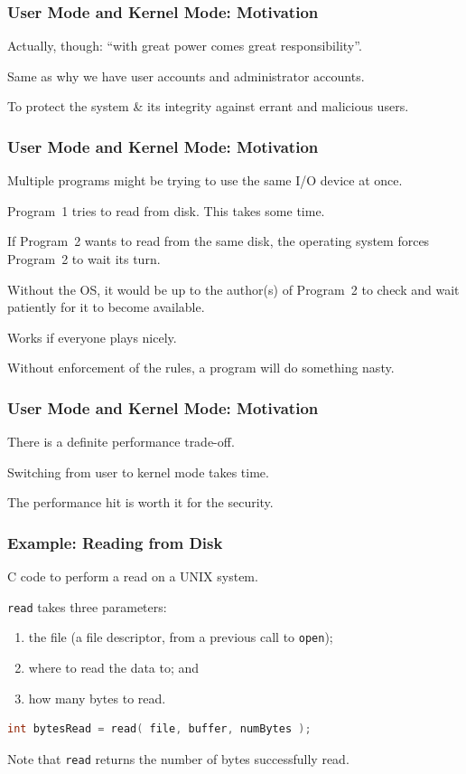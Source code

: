 \begin{frame}
\frametitle{User Mode and Kernel Mode: Motivation}


Actually, though: ``with great power comes great responsibility''.


Same as why we have user accounts and administrator accounts. 

To protect the system \& its integrity against errant and malicious users.


\end{frame}

\begin{frame}
\frametitle{User Mode and Kernel Mode: Motivation}

Multiple programs might be trying to use the same I/O device at once.

Program~1 tries to read from disk. This takes some time.

If Program~2 wants to read from the same disk, the operating system forces Program~2 to wait its turn.

Without the OS, it would be up to the author(s) of Program~2 to check and wait patiently for it to become available. 

Works if everyone plays nicely.

Without enforcement of the rules, a program will do something nasty.

\end{frame}

\begin{frame}
\frametitle{User Mode and Kernel Mode: Motivation}

There is a definite performance trade-off.

Switching from user to kernel mode takes time.

The performance hit is worth it for the security.

\end{frame}

\begin{frame}[fragile]
\frametitle{Example: Reading from Disk}
C code to perform a read on a UNIX system.

\texttt{read} takes three parameters: 
\begin{enumerate}
	\item the file (a file descriptor, from a previous call 
to \texttt{open}); 
	\item where to read the data to; and
	\item how many bytes to read.
\end{enumerate} 

\begin{lstlisting}[language=C]
int bytesRead = read( file, buffer, numBytes );
\end{lstlisting}

Note that \texttt{read} returns the number of bytes successfully read.

\end{frame}


